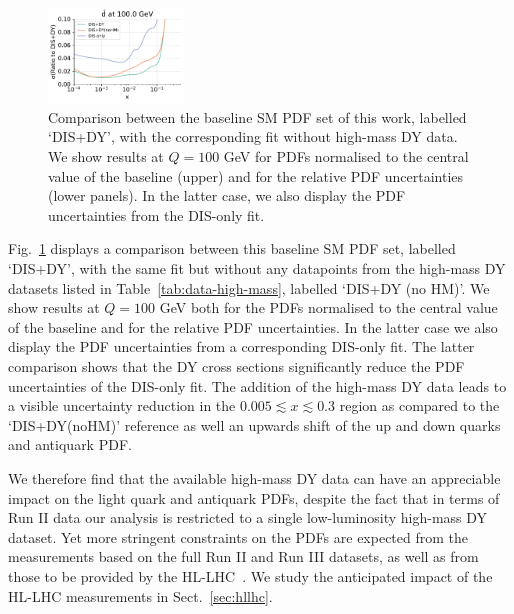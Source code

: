 \documentclass[withindex,glossary]{cam-thesis}
\begin{document}
\begin{figure}[H]
  \includegraphics[width=0.32\textwidth]{dy_figures/HDMY_Bases1_UncRanges_UncPDFs_plot_pdf_uncertainties_bard.pdf}
  \caption{\small \small Comparison between the baseline SM PDF set of this work, labelled `DIS+DY', with
    the corresponding fit without high-mass DY data.
  We show results at $Q=100$ GeV for PDFs normalised to the central value of the baseline (upper) and
  for the relative PDF uncertainties (lower panels).
  In the latter case, we also display the PDF uncertainties from the DIS-only fit.
  \label{fig:pdfplot-impactHMDY}}
\end{figure}

Fig.~\ref{fig:pdfplot-impactHMDY} displays a comparison
between this baseline SM PDF set, labelled `DIS+DY', with
the same fit but without any datapoints from the high-mass DY datasets
listed in Table~\ref{tab:data-high-mass}, labelled `DIS+DY (no HM)'.
%
 We show results at $Q=100$ GeV both for the PDFs normalised to the
 central value of the baseline and for the relative PDF
 uncertainties. In the latter case we also display the PDF uncertainties from a corresponding DIS-only fit.
The latter comparison shows that the DY cross sections significantly reduce
the PDF uncertainties of the DIS-only fit.
%
The addition of the high-mass DY data leads to a visible  
uncertainty reduction in the $0.005 \lesssim x\lesssim  0.3$ region
as compared to the `DIS+DY(noHM)' reference as well an upwards shift
of the up and down quarks and antiquark PDF.

We therefore find that the available high-mass DY data can
have an appreciable impact on the light quark and antiquark PDFs,
despite the fact that in terms of Run II data our  analysis is restricted to a single low-luminosity 
 high-mass DY dataset.
%
Yet more stringent constraints on the PDFs are expected from the measurements based
on the full Run II and Run III datasets,
as well as from those to be provided by the HL-LHC~\cite{Khalek:2018mdn}.
%
We study the anticipated impact of the HL-LHC measurements in
Sect.~\ref{sec:hllhc}.

\end{document}
